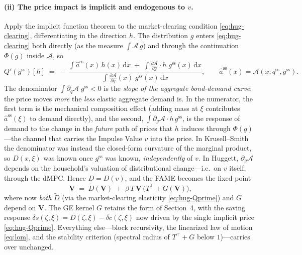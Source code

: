 \documentclass[11pt]{article}
\newcommand{\gss}{g^{\mathrm{ss}}}
\newcommand{\dd}{\,\mathrm{d}}
\begin{document}
\paragraph{(ii) The price impact is implicit and endogenous to $v$.}
Apply the implicit function theorem to the market-clearing condition
\eqref{eq:hug-clearing}, differentiating in the direction $h$. The distribution
$g$ enters \eqref{eq:hug-clearing} both directly (as the measure $\int\mathcal A\,g$)
and through the continuation $\Phi(g)$ inside $\mathcal A$, so
\begin{equation}\label{eq:hug-Qprime}
  Q'(\gss)[h]
  \;=\;-\,\frac{\displaystyle \int \hat a^{\mathrm{ss}}(x)\,h(x)\dd x
        \;+\;\int \frac{\partial \mathcal A}{\partial g}\!\cdot h\;\gss(x)\dd x}
       {\displaystyle \int \frac{\partial \mathcal A}{\partial q}(x)\;\gss(x)\dd x },
  \qquad \hat a^{\mathrm{ss}}(x)=\mathcal A(x;q^{\mathrm{ss}},\gss).
\end{equation}
The denominator $\int \partial_q\mathcal A\;\gss<0$ is the \emph{slope of the aggregate
bond-demand curve}; the price moves \emph{more} the \emph{less} elastic aggregate
demand is. In the numerator, the first term is the mechanical composition effect
(adding mass at $\xi$ contributes $\hat a^{\mathrm{ss}}(\xi)$ to demand directly), and
the second, $\int \partial_g\mathcal A\cdot h\,\gss$, is the response of demand to the
change in the \emph{future} path of prices that $h$ induces through $\Phi(g)$---the
channel that carries the Impulse Value $v$ into the price. In Krusell--Smith the
denominator was instead the closed-form curvature of the marginal product, so
$D(x,\xi)$ was known once $\gss$ was known, \emph{independently} of $v$. In Huggett,
$\partial_g\mathcal A$ depends on the household's valuation of distributional
change---i.e.\ on $v$ itself, through the dMPC. Hence $D=D(v)$, and the FAME becomes the
fixed point
\begin{equation}\label{eq:hug-sylvester}
  \mathbf V \;=\; \widetilde D(\mathbf V) \;+\; \beta\,T\,\mathbf V\,\big(T^{\top}+G(\mathbf V)\big),
\end{equation}
where now \emph{both} $\widetilde D$ (via the market-clearing elasticity
\eqref{eq:hug-Qprime}) and $G$ depend on $\mathbf V$. The GE kernel $G$ retains the
form of Section~4, with the saving response $\delta s(\zeta,\xi)=D(\zeta,\xi)-\delta
c(\zeta,\xi)$ now driven by the single implicit price \eqref{eq:hug-Qprime}.
Everything else---block recursivity, the linearized law of motion
\eqref{eq:lom}, and the stability criterion (spectral radius of $T^{\top}+G$ below
$1$)---carries over unchanged.
\end{document}
